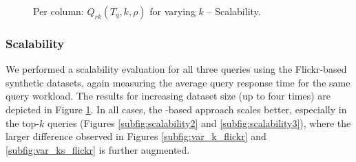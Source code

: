 \begin{figure}[ht!]
 \quad
{}
\caption{Per column: $Q_{rk}(T_q, k, \rho)$ for varying $k$ -- Scalability.}
\label{fig:exp2_sim}
\end{figure}

\subsubsection{Scalability}
\label{subsec:scalability}
We performed a scalability evaluation for all three queries using the Flickr-based synthetic datasets, again measuring the average query response time for the same query workload. The results for increasing dataset size (up to four times) are depicted in Figure \ref{fig:exp2_sim}. In all cases, the \sbtsr-based approach scales better, especially in the top-$k$ queries (Figures \ref{subfig:scalability2} and \ref{subfig:scalability3}), where the larger difference observed in Figures \ref{subfig:var_k_flickr} and \ref{subfig:var_ks_flickr} is further augmented.